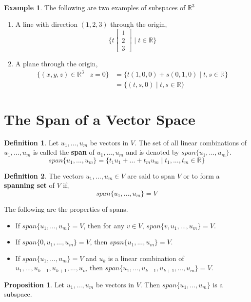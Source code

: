 \documentclass{report}
\theoremstyle{definition}
\newtheorem*{_def}{Definition}
\newtheorem{_prop}[_thm]{Proposition}
\newtheorem{ex}{Example}[section]
\theoremstyle{remark}
\begin{document}
\begin{ex} The following are two examples of subspaces of $\mathbb{R}^3$
\begin{enumerate}
 \item A line with direction $(1,2,3)$ through the origin,
 \[\{t\begin{bmatrix}
 1 \\ 2 \\ 3
 \end{bmatrix} \mid t\in \mathbb{R} \}\]
 \item A plane through the origin,
 \begin{align*}
 \{(x,y,z)\in \mathbb{R}^3\mid z=0\}
 &=\{t(1,0,0)+s(0,1,0)\mid t,s\in \mathbb{R}\} \\
 &=\{(t,s,0)\mid t,s\in \mathbb{R}\}
 \end{align*}

\end{enumerate}
\end{ex}

\section{The Span of a Vector Space}

\begin{_def}
Let $u_1,...,u_m$ be vectors in $V$.
The set of all linear combinations of $u_1,...,u_m$ is called the \textbf{span} of $u_1,...,u_m$ and is denoted by $span\{u_1,...,u_m\}$.
\[span\{u_1,...,u_m\}=\{t_1u_1+...+t_mu_m\mid t_1,...,t_m\in \mathbb{R}\}\]
\end{_def}

\begin{_def}
The vectors $u_1,...,u_m\in V$ are said to span $V$ or to form a \textbf{spanning set} of $V$ if,
\[span\{u_1,...,u_m\}=V\]
\end{_def}

The following are the properties of spans.
\begin{itemize}
 \item If $span\{u_1,...,u_m\}=V$, then for any $v\in V$, $span\{v,u_1,...,u_m\}=V$.
 \item If $span\{0,u_1,...,u_m\}=V$, then $span\{u_1,...,u_m\}=V$.
 \item If $span\{u_1,...,u_m\}=V$ and $u_k$ is a linear combination of $u_1,...,u_{k-1},u_{k+1},...,u_m$ then $span\{u_1,...,u_{k-1},u_{k+1},...,u_m\}=V$.
\end{itemize}

\begin{_prop}
Let $u_1,...,u_m$ be vectors in $V$.
Then $span\{u_1,...,u_m\}$ is a subspace.
\end{_prop}
\end{document}
